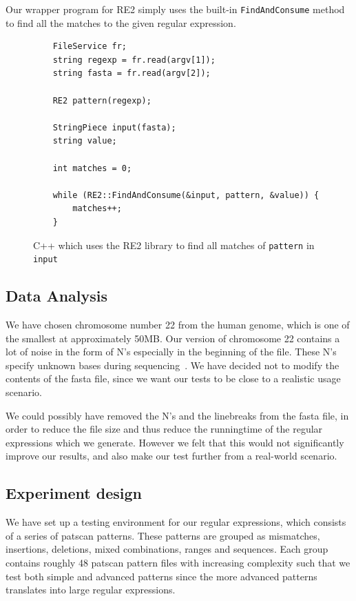 \documentclass[12pt]{article}
\theoremstyle{definition}
\begin{document}
Our wrapper program for RE2 simply uses the built-in \texttt{FindAndConsume} method to find all the matches to the given regular expression.

\begin{figure}[H]
	\begin{lstlisting}
	FileService fr;
    string regexp = fr.read(argv[1]);
    string fasta = fr.read(argv[2]);

    RE2 pattern(regexp);

    StringPiece input(fasta);
    string value;
    
    int matches = 0;

    while (RE2::FindAndConsume(&input, pattern, &value)) {
        matches++;
    }
	\end{lstlisting}
	\caption{C++ which uses the RE2 library to find all matches of \texttt{pattern} in \texttt{input}}
\end{figure}

\subsection{Data Analysis}

We have chosen chromosome number 22 from the human genome, which is one of the smallest at approximately 50MB. Our version of chromosome 22 contains a lot of noise in the form of N's especially in the beginning of the file. These N's specify unknown bases during sequencing~\cite{human-genome}. We have decided not to modify the contents of the fasta file, since we want our tests to be close to a realistic usage scenario.

We could possibly have removed the N's and the linebreaks from the fasta file, in order to reduce the file size and thus reduce the runningtime of the regular expressions which we generate. However we felt that this would not significantly improve our results, and also make our test further from a real-world scenario.

\subsection{Experiment design}

We have set up a testing environment for our regular expressions, which consists of a series of patscan patterns. These patterns are grouped as mismatches, insertions, deletions, mixed combinations, ranges and sequences. Each group contains roughly 48 patscan pattern files with increasing complexity such that we test both simple and advanced patterns since the more advanced patterns translates into large regular expressions. 
\end{document}
